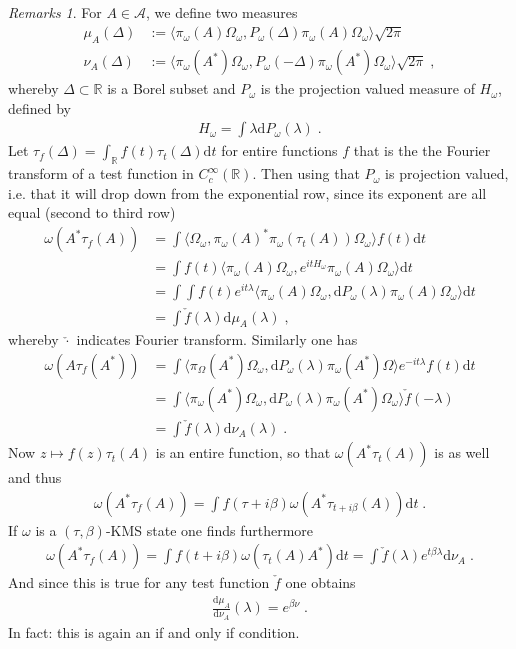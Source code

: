 \documentclass[
a4paper, %
11pt, %
onecolumn, %
openany, %
]{memoir}
\theoremstyle{definition}
\theoremstyle{remark}
\newtheorem{remarks}{Remarks}[chapter]
\theoremstyle{plain}
\begin{document}
\begin{remarks}
	For $A\in\mathcal{A}$, we define two measures\begin{align}
	\mu_A(\Delta)&:=\langle\pi_{\omega}(A)\Omega_{\omega},P_{\omega}(\Delta)\pi_{\omega}(A)\Omega_{\omega}\rangle \sqrt{2\pi}\\
	\nu_A(\Delta)&:=\langle \pi_{\omega}(A^*)\Omega_{\omega},P_{\omega}(-\Delta)\pi_{\omega}(A^*)\Omega_{\omega}\rangle \sqrt{2\pi}	\; ,
	\end{align}
whereby $\Delta\subset\mathbb{R}$ is a Borel subset and $P_{\omega}$ is the projection valued measure of $H_{\omega}$, defined by \begin{align}
H_{\omega}=\int\lambda \mathrm{d}P_{\omega}(\lambda)\; .
\end{align}
Let $\tau_f(\Delta)=\int_{\mathbb{R}}f(t)\tau_t(\Delta)\mathrm{d}t$ for entire functions $f$ that is the the Fourier transform of a test function in $C_c^{\infty}(\mathbb{R})$. Then using that $P_{\omega}$ is projection valued, i.e. that it will drop down from the exponential row, since its exponent are all equal (second to third row)\begin{align}
\omega(A^*\tau_f(A))&=\int\langle \Omega_{\omega},\pi_{\omega}(A)^*\pi_{\omega}(\tau_t(A))\Omega_{\omega}\rangle f(t)\mathrm{d}t\\
&=\int f(t)\langle \pi_{\omega}(A)\Omega_{\omega},e^{itH_{\omega}}\pi_{\omega}(A)\Omega_{\omega}\rangle\mathrm{d}t\\
&=\int\int f(t)e^{it\lambda}\langle\pi_{\omega}(A)\Omega_{\omega},\mathrm{d}P_{\omega}(\lambda)\pi_{\omega}(A)\Omega_{\omega}\rangle\mathrm{d}t\\
&=\int \check{f}(\lambda)\mathrm{d}\mu_{A}(\lambda)\;,
\end{align}
whereby $\check{\cdot}$ indicates Fourier transform. Similarly one has \begin{align}
\omega(A\tau_f(A^*))&=\int \langle \pi_{\Omega}(A^*)\Omega_{\omega},\mathrm{d}P_{\omega}(\lambda)\pi_{\omega}(A^*)\Omega\rangle e^{-it\lambda}f(t)\mathrm{d}t\\
&=\int \langle \pi_{\omega}(A^*)\Omega_{\omega},\mathrm{d}P_{\omega}(\lambda) \pi_{\omega}(A^*)\Omega_{\omega}\rangle\check{f}(-\lambda)\\
&=\int \check{f}(\lambda)\mathrm{d}\nu_A(\lambda)\; .
\end{align}
Now $z\mapsto f(z)\tau_t(A)$ is an entire function, so that $\omega(A^*\tau_t(A))$ is as well and thus \begin{align}
\omega(A^*\tau_f(A))=\int f(\tau+i\beta)\omega(A^*\tau_{t+i\beta}(A))\mathrm{d}t\; .
\end{align}
If $\omega$ is a $(\tau,\beta)$-KMS state one finds furthermore \begin{align}
\omega(A^*\tau_f(A))=\int f(t+i\beta)\omega(\tau_t(A)A^*)\mathrm{d}t=\int\check{f}(\lambda)e^{t\beta \lambda}\mathrm{d}\nu_A\; .
\end{align}
And since this is true for any test function $\check{f}$ one obtains \begin{align}
\frac{\mathrm{d}\mu_{A}}{\mathrm{d}\nu_{A}}(\lambda)=e^{\beta\nu}\; .
\end{align}
In fact: this is again an if and only if condition. \end{remarks}
\end{document}
